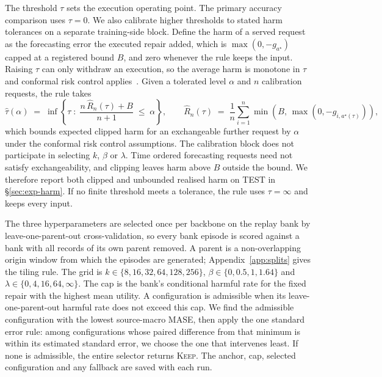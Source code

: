 \documentclass{article}
\begin{document}
The threshold $\tau$ sets the execution operating point. The primary accuracy comparison
uses $\tau=0$. We also calibrate higher thresholds to stated harm tolerances on a separate
training-side block. Define the harm of a served request as the
forecasting error the executed repair added, which is $\max(0, -g_{a^{\star}})$ capped at a
registered bound $B$, and zero whenever the rule keeps the input. Raising $\tau$ can only
withdraw an execution, so the average harm is monotone in $\tau$ and conformal risk
control applies~\citep{angelopoulos2024conformal}. Given a tolerated
level $\alpha$ and $n$ calibration requests, the rule takes
\begin{equation}
  \hat\tau(\alpha) \;=\; \inf\left\{ \tau \;:\;
    \frac{n\, \hat{R}_n(\tau) + B}{n+1} \;\le\; \alpha \right\},
  \qquad
  \hat{R}_n(\tau) \;=\; \frac{1}{n}\sum_{i=1}^{n} \min\!\left(B,\, \max(0, -g_{i,a^{\star}(\tau)})\right),
  \label{eq:crc}
\end{equation}
which bounds expected clipped harm for an exchangeable further request by $\alpha$ under
the conformal risk control assumptions. The calibration block does not participate in
selecting $k$, $\beta$ or $\lambda$. Time ordered forecasting requests need not satisfy
exchangeability, and clipping leaves harm above $B$ outside the bound. We therefore report
both clipped and unbounded realised harm on TEST in \S\ref{sec:exp-harm}. If no finite
threshold meets a tolerance, the rule uses $\tau=\infty$ and keeps every input.

The three hyperparameters are selected once per backbone on the replay bank by
leave-one-parent-out cross-validation, so every bank episode is scored against a bank with all
records of its own parent removed. A parent is a non-overlapping origin window from which the
episodes are generated; Appendix~\ref{app:splits} gives the tiling rule. The grid is
$k \in \{8,16,32,64,128,256\}$, $\beta \in \{0,0.5,1,1.64\}$ and
$\lambda \in \{0,4,16,64,\infty\}$. The cap is the bank's conditional harmful rate for
the fixed repair with the highest mean utility. A configuration is admissible when its
leave-one-parent-out harmful rate does not exceed this cap. We find the admissible
configuration with the lowest source-macro MASE, then apply the one standard error rule:
among configurations whose paired difference from that minimum is within its estimated
standard error, we choose the one that intervenes least. If none is admissible, the entire
selector returns \textsc{Keep}. The anchor, cap, selected configuration and any fallback
are saved with each run.
\end{document}
